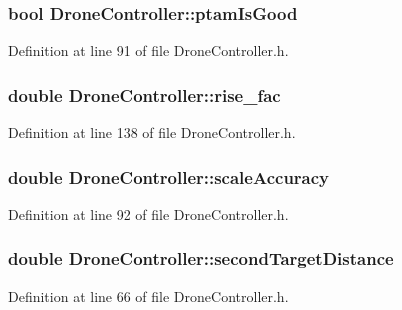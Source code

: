 \subsubsection[{ptam\-Is\-Good}]{\setlength{\rightskip}{0pt plus 5cm}bool Drone\-Controller\-::ptam\-Is\-Good\hspace{0.3cm}{\ttfamily [private]}}\label{classDroneController_a3aaa484281bcd83c13e446fcf93ca09b}


Definition at line 91 of file Drone\-Controller.\-h.

\subsubsection[{rise\-\_\-fac}]{\setlength{\rightskip}{0pt plus 5cm}double Drone\-Controller\-::rise\-\_\-fac}\label{classDroneController_a71893a0f3625c701e5d7298c76c6245b}


Definition at line 138 of file Drone\-Controller.\-h.

\subsubsection[{scale\-Accuracy}]{\setlength{\rightskip}{0pt plus 5cm}double Drone\-Controller\-::scale\-Accuracy\hspace{0.3cm}{\ttfamily [private]}}\label{classDroneController_af9cc50a89d8d16083d92ad8aa05eca5c}


Definition at line 92 of file Drone\-Controller.\-h.

\subsubsection[{second\-Target\-Distance}]{\setlength{\rightskip}{0pt plus 5cm}double Drone\-Controller\-::second\-Target\-Distance\hspace{0.3cm}{\ttfamily [private]}}\label{classDroneController_af0d4203b36f5803740d2be5e8880f277}


Definition at line 66 of file Drone\-Controller.\-h.

